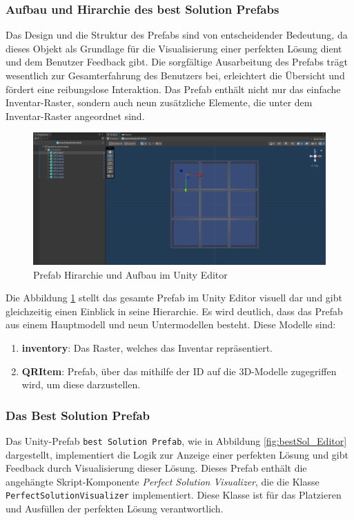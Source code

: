 \subsubsection{Aufbau und Hirarchie des best Solution Prefabs}
Das Design und die Struktur des Prefabs sind von entscheidender Bedeutung, da dieses Objekt als Grundlage für die Visualisierung
einer perfekten Lösung dient und dem Benutzer Feedback gibt. Die sorgfältige Ausarbeitung des Prefabs trägt wesentlich zur
Gesamterfahrung des Benutzers bei, erleichtert die Übersicht und fördert eine reibungslose Interaktion. Das Prefab enthält
nicht nur das einfache Inventar-Raster, sondern auch neun zusätzliche Elemente, die unter dem Inventar-Raster angeordnet sind.
\begin{figure}[H]
    \centering
    \includegraphics[scale=0.3]{images/prefShow}
    \caption{Prefab Hirarchie und Aufbau im Unity Editor}
    \label{fig:InvPref}
\end{figure}
Die Abbildung \ref{fig:InvPref} stellt das gesamte Prefab im Unity Editor visuell dar und gibt gleichzeitig einen Einblick
in seine Hierarchie. Es wird deutlich, dass das Prefab aus einem Hauptmodell und neun Untermodellen besteht. Diese Modelle sind:
\begin{enumerate}
    \item \textbf{inventory}: Das Raster, welches das Inventar repräsentiert.

    \item \textbf{QRItem}: Prefab, über das mithilfe der ID auf die 3D-Modelle zugegriffen wird, um diese darzustellen.
\end{enumerate}

\subsubsection{Das Best Solution Prefab}
Das Unity-Prefab \texttt{best Solution Prefab}, wie in Abbildung \ref{fig:bestSol_Editor} dargestellt, implementiert die
Logik zur Anzeige einer perfekten Lösung und gibt Feedback durch Visualisierung dieser Lösung. Dieses Prefab enthält die
angehängte Skript-Komponente \textit{Perfect Solution Visualizer}, die die Klasse \texttt{PerfectSolutionVisualizer}
implementiert. Diese Klasse ist für das Platzieren und Ausfüllen der perfekten Lösung verantwortlich.

